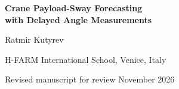 \documentclass[11pt,a4paper]{article}
\begin{document}
\begin{center}
{\LARGE\bfseries Crane Payload-Sway Forecasting\\[3pt]
with Delayed Angle Measurements\par}
\vspace{11pt}
{\large Ratmir Kutyrev\par}
\vspace{3pt}
{\small H-FARM International School, Venice, Italy\par}
\vspace{8pt}
{\small Revised manuscript for review \enspace\textbullet{} November 2026\par}
\end{center}
\vspace{4pt}

\clearpage
\begingroup
\small


\endgroup
\end{document}
